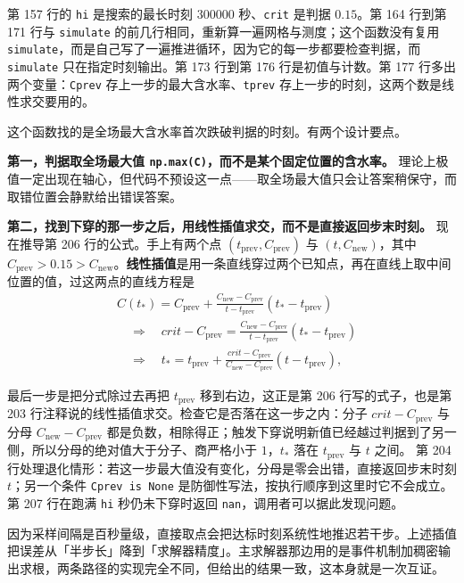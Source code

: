 第 157 行的 \texttt{hi} 是搜索的最长时刻 $300000$ 秒、\texttt{crit} 是判据 $0.15$。第 164 行到第 171 行与 \texttt{simulate} 的前几行相同，重新算一遍网格与测度；这个函数没有复用 \texttt{simulate}，而是自己写了一遍推进循环，因为它的每一步都要检查判据，而 \texttt{simulate} 只在指定时刻输出。第 173 行到第 176 行是初值与计数。第 177 行多出两个变量：\texttt{Cprev} 存上一步的最大含水率、\texttt{tprev} 存上一步的时刻，这两个数是线性求交要用的。

这个函数找的是全场最大含水率首次跌破判据的时刻。有两个设计要点。

\textbf{第一，判据取全场最大值 \texttt{np.max(C)}，而不是某个固定位置的含水率。}
理论上极值一定出现在轴心，但代码不预设这一点——取全场最大值只会让答案稍保守，而取错位置会静默给出错误答案。

\textbf{第二，找到下穿的那一步之后，用线性插值求交，而不是直接返回步末时刻。}
现在推导第 206 行的公式。手上有两个点 $\left(t_{\text{prev}},C_{\text{prev}}\right)$ 与 $\left(t,C_{\text{new}}\right)$，其中 $C_{\text{prev}}>0.15>C_{\text{new}}$。\textbf{线性插值}是用一条直线穿过两个已知点，再在直线上取中间位置的值，过这两点的直线方程是
\begin{equation}
\begin{aligned}
&C(t_*)=C_{\text{prev}}+\frac{C_{\text{new}}-C_{\text{prev}}}{t-t_{\text{prev}}}\left(t_*-t_{\text{prev}}\right)\\
&\quad\Longrightarrow\quad
crit-C_{\text{prev}}=\frac{C_{\text{new}}-C_{\text{prev}}}{t-t_{\text{prev}}}\left(t_*-t_{\text{prev}}\right)\\
&\quad\Longrightarrow\quad
t_*=t_{\text{prev}}+\frac{crit-C_{\text{prev}}}{C_{\text{new}}-C_{\text{prev}}}\left(t-t_{\text{prev}}\right),
\end{aligned}
\label{eq:p5-cross}
\end{equation}

最后一步是把分式除过去再把 $t_{\text{prev}}$ 移到右边，这正是第 206 行写的式子，也是第 203 行注释说的线性插值求交。检查它是否落在这一步之内：分子 $crit-C_{\text{prev}}$ 与分母 $C_{\text{new}}-C_{\text{prev}}$ 都是负数，相除得正；触发下穿说明新值已经越过判据到了另一侧，所以分母的绝对值大于分子、商严格小于 $1$，$t_*$ 落在 $t_{\text{prev}}$ 与 $t$ 之间。
第 204 行处理退化情形：若这一步最大值没有变化，分母是零会出错，直接返回步末时刻 $t$；另一个条件 \texttt{Cprev is None} 是防御性写法，按执行顺序到这里时它不会成立。第 207 行在跑满 \texttt{hi} 秒仍未下穿时返回 \texttt{nan}，调用者可以据此发现问题。

因为采样间隔是百秒量级，直接取点会把达标时刻系统性地推迟若干步。上述插值把误差从「半步长」降到「求解器精度」。主求解器那边用的是事件机制加稠密输出求根，两条路径的实现完全不同，但给出的结果一致，这本身就是一次互证。

